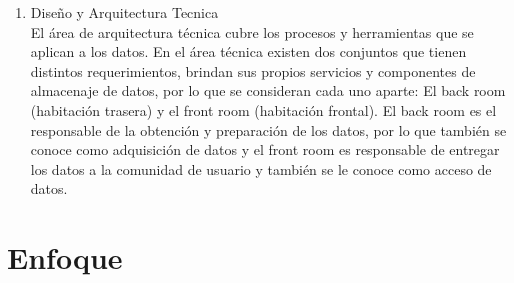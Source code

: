 \documentclass[preprint,12pt]{elsarticle}
\begin{document}
\begin{enumerate}[4.1]
\item Diseño y Arquitectura Tecnica \\

El área de arquitectura técnica cubre los procesos y herramientas que se aplican a los datos. En el área técnica existen dos conjuntos que tienen distintos requerimientos, brindan sus propios servicios y componentes de almacenaje de datos, por lo que se consideran cada uno aparte: El back room (habitación trasera) y el front room (habitación frontal). El back room es el responsable de la obtención y preparación de los datos, por lo que también se conoce como adquisición de datos y el front room es responsable de entregar los datos a la comunidad de usuario y también se le conoce como acceso de datos.\\
\end{enumerate}

\section{Enfoque}
 
\end{document}

